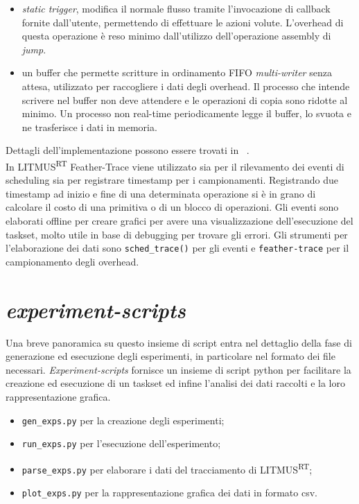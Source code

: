 \begin{appendices}
\begin{itemize}
	\item \textit{static trigger}, modifica il normale flusso tramite l'invocazione di callback fornite dall'utente, permettendo di effettuare le azioni volute. L'overhead di questa operazione è reso minimo dall'utilizzo dell'operazione assembly di \textit{jump}.
	\item un buffer che permette scritture in ordinamento FIFO \textit{multi-writer} senza attesa, utilizzato per raccogliere i dati degli overhead. Il processo che intende scrivere nel buffer non deve attendere e le operazioni di copia sono ridotte al minimo. Un processo non real-time periodicamente legge il buffer, lo svuota e ne trasferisce i dati in memoria.\\
\end{itemize}

\noindent Dettagli dell'implementazione possono essere trovati in ~\cite{Brandenburg07feather-trace:a}.\\

\noindent In LITMUS\textsuperscript{RT} Feather-Trace viene utilizzato sia per il rilevamento dei eventi di scheduling sia per registrare timestamp per i campionamenti. Registrando due timestamp ad inizio e fine di una determinata operazione si è in grano di calcolare il costo di una primitiva o di un blocco di operazioni. Gli eventi sono elaborati offline per creare grafici per avere una visualizzazione dell'esecuzione del taskset, molto utile in base di debugging per trovare gli errori. Gli strumenti per l'elaborazione dei dati sono \texttt{sched\_trace()} per gli eventi e \texttt{feather-trace} per il campionamento degli overhead.\\

\section{\textit{experiment-scripts}}
\label{sec:exp-script}

\noindent Una breve panoramica su questo insieme di script entra nel dettaglio della fase di generazione ed esecuzione degli esperimenti, in particolare nel formato dei file necessari. \textit{Experiment-scripts} fornisce un insieme di script python per facilitare la creazione ed esecuzione di un taskset ed infine l'analisi dei dati raccolti e la loro rappresentazione grafica.\\

\begin{itemize}
	\item \texttt{gen\_exps.py} per la creazione degli esperimenti;
	\item \texttt{run\_exps.py} per l'esecuzione dell'esperimento;
	\item \texttt{parse\_exps.py} per elaborare i dati del tracciamento di LITMUS\textsuperscript{RT};
	\item \texttt{plot\_exps.py} per la rappresentazione grafica dei dati in formato csv.
\end{itemize}


\end{appendices}
